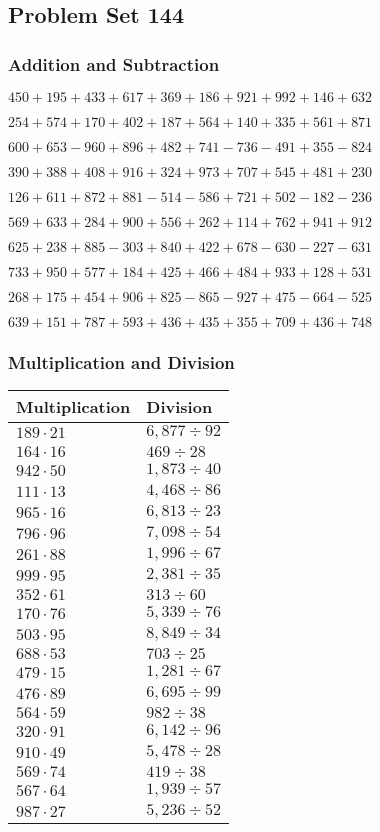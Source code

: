 \hypertarget{problem-set-144}{%
\subsection{Problem Set 144}\label{problem-set-144}}

\hypertarget{addition-and-subtraction}{%
\subsubsection{Addition and
Subtraction}\label{addition-and-subtraction}}

\(450 +195 +433 +617 +369 +186 +921 +992 +146 +632\)

\(254 +574 +170 +402 +187 +564 +140 +335 +561 +871\)

\(600 +653 - 960 +896 +482 +741 - 736 - 491 +355 - 824\)

\(390 +388 +408 +916 +324 +973 +707 +545 +481 +230\)

\(126 +611 +872 +881 - 514 - 586 +721 +502 - 182 - 236\)

\(569 +633 +284 +900 +556 +262 +114 +762 +941 +912\)

\(625 +238 +885 - 303 +840 +422 +678 - 630 - 227 - 631\)

\(733 +950 +577 +184 +425 +466 +484 +933 +128 +531\)

\(268 +175 +454 +906 +825 - 865 - 927 +475 - 664 - 525\)

\(639 +151 +787 +593 +436 +435 +355 +709 +436 +748\)

\hypertarget{multiplication-and-division}{%
\subsubsection{Multiplication and
Division}\label{multiplication-and-division}}

\begin{longtable}[]{@{}ll@{}}
\toprule
Multiplication & Division\tabularnewline
\midrule
\endhead
\(189 \cdot 21\) & \(6,877÷92\)\tabularnewline
\(164 \cdot 16\) & \(469÷28\)\tabularnewline
\(942 \cdot 50\) & \(1,873÷40\)\tabularnewline
\(111 \cdot 13\) & \(4,468÷86\)\tabularnewline
\(965 \cdot 16\) & \(6,813÷23\)\tabularnewline
\(796 \cdot 96\) & \(7,098÷54\)\tabularnewline
\(261 \cdot 88\) & \(1,996÷67\)\tabularnewline
\(999 \cdot 95\) & \(2,381÷35\)\tabularnewline
\(352 \cdot 61\) & \(313÷60\)\tabularnewline
\(170 \cdot 76\) & \(5,339÷76\)\tabularnewline
\(503 \cdot 95\) & \(8,849÷34\)\tabularnewline
\(688 \cdot 53\) & \(703÷25\)\tabularnewline
\(479 \cdot 15\) & \(1,281÷67\)\tabularnewline
\(476 \cdot 89\) & \(6,695÷99\)\tabularnewline
\(564 \cdot 59\) & \(982÷38\)\tabularnewline
\(320 \cdot 91\) & \(6,142÷96\)\tabularnewline
\(910 \cdot 49\) & \(5,478÷28\)\tabularnewline
\(569 \cdot 74\) & \(419÷38\)\tabularnewline
\(567 \cdot 64\) & \(1,939÷57\)\tabularnewline
\(987 \cdot 27\) & \(5,236÷52\)\tabularnewline
\bottomrule
\end{longtable}
